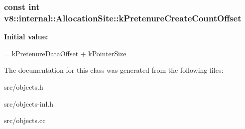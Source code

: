 \subsubsection[{k\+Pretenure\+Create\+Count\+Offset}]{\setlength{\rightskip}{0pt plus 5cm}const int v8\+::internal\+::\+Allocation\+Site\+::k\+Pretenure\+Create\+Count\+Offset\hspace{0.3cm}{\ttfamily [static]}}\label{classv8_1_1internal_1_1_allocation_site_ad4371d69986a9a4dad979104ed388710}
{\bfseries Initial value\+:}
\begin{DoxyCode}
=
      kPretenureDataOffset + kPointerSize
\end{DoxyCode}


The documentation for this class was generated from the following files\+:\begin{DoxyCompactItemize}
\item 
src/objects.\+h\item 
src/objects-\/inl.\+h\item 
src/objects.\+cc\end{DoxyCompactItemize}
